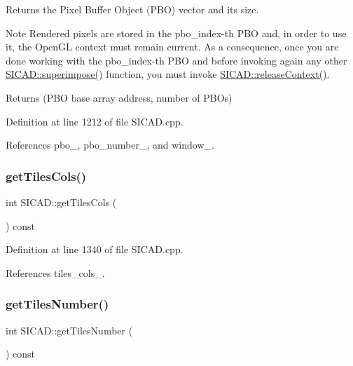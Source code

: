 Returns the Pixel Buffer Object (P\+BO) vector and its size. 

\begin{DoxyNote}{Note}
Rendered pixels are stored in the {\ttfamily pbo\+\_\+index}-\/th P\+BO and, in order to use it, the Open\+GL context must remain current. As a consequence, once you are done working with the {\ttfamily pbo\+\_\+index}-\/th P\+BO and before invoking again any other {\ttfamily \mbox{\hyperlink{classSICAD_a356e0ac8a0f130952a72326bedd4ab60}{S\+I\+C\+A\+D\+::superimpose()}}} function, you must invoke {\ttfamily \mbox{\hyperlink{classSICAD_ae626fa7f8fd4dc5fc4bdc4f5311beede}{S\+I\+C\+A\+D\+::release\+Context()}}}.
\end{DoxyNote}
\begin{DoxyReturn}{Returns}
(P\+BO base array address, number of P\+B\+Os) 
\end{DoxyReturn}


Definition at line 1212 of file S\+I\+C\+A\+D.\+cpp.



References pbo\+\_\+, pbo\+\_\+number\+\_\+, and window\+\_\+.

\mbox{\label{classSICAD_a2ba3a0aeb3dab9996bdeed19a16eae56}} 
\subsubsection{\texorpdfstring{get\+Tiles\+Cols()}{getTilesCols()}}
{\footnotesize\ttfamily int S\+I\+C\+A\+D\+::get\+Tiles\+Cols (\begin{DoxyParamCaption}{ }\end{DoxyParamCaption}) const}



Definition at line 1340 of file S\+I\+C\+A\+D.\+cpp.



References tiles\+\_\+cols\+\_\+.

\mbox{\label{classSICAD_a728f82ebbfeea54f3fef2fc0c56a4964}} 
\subsubsection{\texorpdfstring{get\+Tiles\+Number()}{getTilesNumber()}}
{\footnotesize\ttfamily int S\+I\+C\+A\+D\+::get\+Tiles\+Number (\begin{DoxyParamCaption}{ }\end{DoxyParamCaption}) const}



